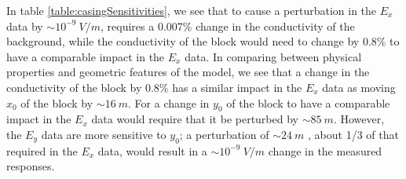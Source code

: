 \documentclass[preprint,review,3p,times,onecolumn,authoryear]{elsarticle}
\begin{document}
In table \ref{table:casingSensitivities}, we see that to cause a perturbation
in the $E_x$ data by $\sim10^{-9}~V/m$, requires a 0.007\% change in the
conductivity of the background, while the conductivity of the block would need
to change by 0.8\% to have a comparable impact in the $E_x$ data.
In comparing between physical properties and geometric features of the model,
we see that a change in the conductivity of
the block by 0.8\% has a similar impact in the $E_x$ data
as moving $x_0$ of the block by $\sim16~m$. For a change in $y_0$ of the block
to have a comparable impact in the $E_x$ data would require that it be perturbed by
$\sim85~m$. However, the $E_y$ data are more sensitive to $y_0$; a perturbation of $\sim24~m$
, about 1/3 of that required in the $E_x$ data, would result in a $\sim10^{-9}~V/m$ change in the
measured responses.
\end{document}
